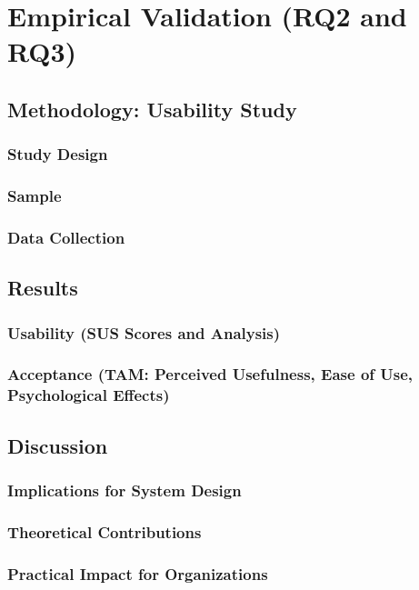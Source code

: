 \chapter{Empirical Validation (RQ2 and RQ3)}
\section{Methodology: Usability Study}
\subsection{Study Design}
\subsection{Sample}
\subsection{Data Collection}
\section{Results}
\subsection{Usability (SUS Scores and Analysis)}
\subsection{Acceptance (TAM: Perceived Usefulness, Ease of Use, Psychological Effects)}
\section{Discussion}
\subsection{Implications for System Design}
\subsection{Theoretical Contributions}
\subsection{Practical Impact for Organizations}